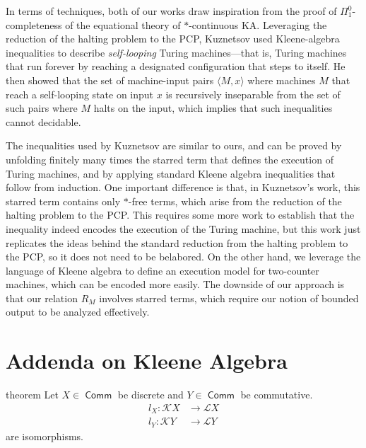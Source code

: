 \documentclass[a4paper,UKenglish,cleveref, autoref, thm-restate]{lipics-v2021}
\DeclareMathOperator{\Comm}{\mathsf{Comm}}
\begin{document}
In terms of techniques, both of our works draw inspiration from the proof of
$ \Pi _1^0$-completeness of the equational theory of $*$-continuous
KA. Leveraging the reduction of the halting problem to the PCP, Kuznetsov used
Kleene-algebra inequalities to describe \emph{self-looping} Turing
machines---that is, Turing machines that run forever by reaching a designated
configuration that steps to itself.  He then showed that the set of machine-input pairs
$ \langle M ,x \rangle $ where machines $M$ that reach a self-looping state on
input $x$ is recursively inseparable from the set of such pairs where $M$ halts
on the input, which implies that such inequalities cannot decidable.

The inequalities used by Kuznetsov are similar to ours, and can be proved by
unfolding finitely many times the starred term that defines the execution of
Turing machines, and by applying standard Kleene algebra inequalities that
follow from induction.  One important difference is that, in Kuznetsov's work,
this starred term contains only $*$-free terms, which arise from the reduction
of the halting problem to the PCP.  This requires some more work to establish
that the inequality indeed encodes the execution of the Turing machine, but this
work just replicates the ideas behind the standard reduction from the halting
problem to the PCP, so it does not need to be belabored. On the other hand, we
leverage the language of Kleene algebra to define an execution model for
two-counter machines, which can be encoded more easily.  The downside of our
approach is that our relation $R_M$ involves starred terms, which require our
notion of bounded output to be analyzed effectively.




\ifappendix

\appendix

\section{Addenda on Kleene Algebra}

\begin{theoremEnd}{theorem}
  \label{thm:language-completeness}
  Let $X  \in  \Comm$ be discrete and $Y  \in  \Comm$ be commutative.
  \begin{align*}
    l_X : \mathcal{K}X &  \to  \mathcal{L}X \\
    l_Y : \mathcal{K}Y &  \to  \mathcal{L}Y
  \end{align*}
  are isomorphisms.
\end{theoremEnd}
\end{document}
